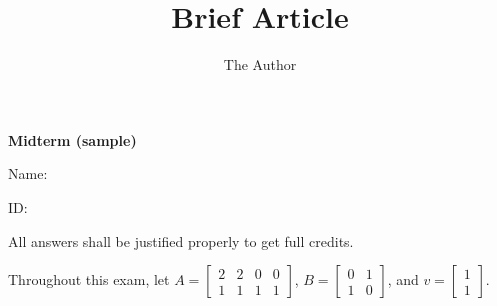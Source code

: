 \documentclass[11pt]{amsart}
\title{Brief Article}
\author{The Author}
\begin{document}

\begin{center}
{\bf Midterm (sample)}
\end{center}

Name: 

ID: 

All answers shall be justified properly to get full credits. 
\vspace{.2in}

Throughout this exam, let 
$A = 
\begin{bmatrix}
2 & 2 & 0& 0\\
1 & 1 & 1 & 1
\end{bmatrix}
$, 
$B = \begin{bmatrix}
0 & 1 \\
1 & 0
\end{bmatrix}
$,
and 
$
v
 = 
\begin{bmatrix}
1\\
1
\end{bmatrix}
$.
\vspace{.1in}
\end{document}
